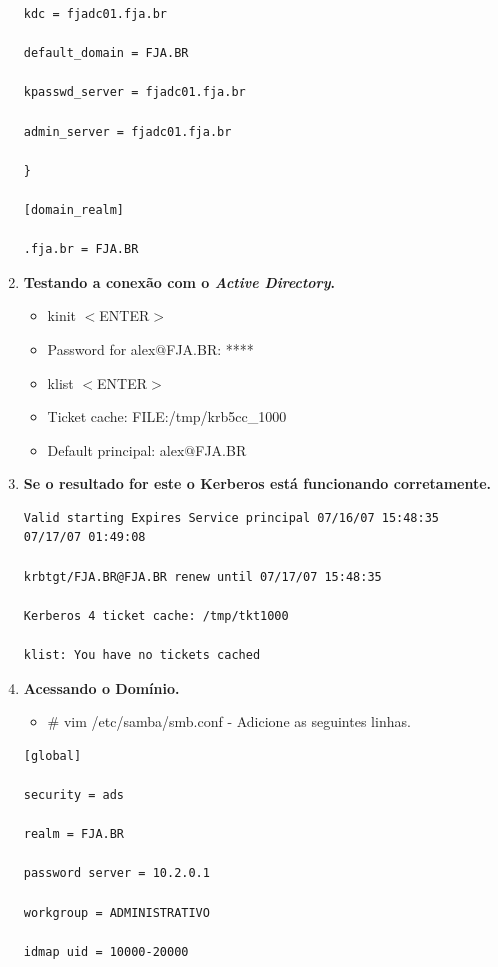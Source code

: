 \begin{enumerate}
\begin{lstlisting}
kdc = fjadc01.fja.br

default_domain = FJA.BR

kpasswd_server = fjadc01.fja.br

admin_server = fjadc01.fja.br

}

[domain_realm]

.fja.br = FJA.BR
\end{lstlisting}

	\item \textbf {Testando a conexão com o \textit{Active Directory}.}
		\begin{itemize}
			\item {kinit $<$ENTER$>$}
			\item {Password for alex$@$FJA.BR: ****}
			\item {klist $<$ENTER$>$}
			\item {Ticket cache: FILE:/tmp/krb5cc\_1000}
			\item {Default principal: alex$@$FJA.BR}
		\end{itemize}

	\item \textbf {Se o resultado for este o Kerberos está funcionando corretamente.}\\

		\begin{lstlisting}
Valid starting Expires Service principal 07/16/07 15:48:35  
07/17/07 01:49:08  

krbtgt/FJA.BR@FJA.BR renew until 07/17/07 15:48:35
	
Kerberos 4 ticket cache: /tmp/tkt1000
	
klist: You have no tickets cached
\end{lstlisting}

	\item \textbf{Acessando o Domínio.}
		\begin{itemize}
			\item {\# vim /etc/samba/smb.conf} -  Adicione as seguintes linhas.\\
		\end{itemize}

		\begin{lstlisting}
[global]

security = ads
		
realm = FJA.BR

password server = 10.2.0.1

workgroup = ADMINISTRATIVO

idmap uid = 10000-20000


\end{lstlisting}
\end{enumerate}
